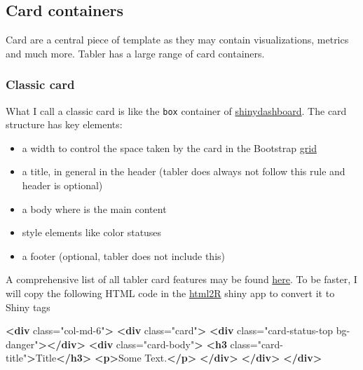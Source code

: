 \documentclass[]{book}
\newenvironment{Shaded}{\begin{snugshade}}{\end{snugshade}}
\newcommand{\KeywordTok}[1]{\textcolor[rgb]{0.13,0.29,0.53}{\textbf{#1}}}
\newcommand{\NormalTok}[1]{#1}
\newcommand{\OtherTok}[1]{\textcolor[rgb]{0.56,0.35,0.01}{#1}}
\newcommand{\StringTok}[1]{\textcolor[rgb]{0.31,0.60,0.02}{#1}}
\providecommand{\tightlist}{%
  \setlength{\itemsep}{0pt}\setlength{\parskip}{0pt}}
\begin{document}
\hypertarget{card-containers}{%
\subsection{Card containers}\label{card-containers}}

Card are a central piece of template as they may contain visualizations, metrics and much more. Tabler has a large range of card containers.

\hypertarget{classic-card}{%
\subsubsection{Classic card}\label{classic-card}}

What I call a classic card is like the \texttt{box} container of \href{https://rstudio.github.io/shinydashboard/structure.html}{shinydashboard}. The card structure has key elements:

\begin{itemize}
\tightlist
\item
  a width to control the space taken by the card in the Bootstrap \href{https://getbootstrap.com/docs/4.0/layout/grid/}{grid}
\item
  a title, in general in the header (tabler does always not follow this rule and header is optional)
\item
  a body where is the main content
\item
  style elements like color statuses
\item
  a footer (optional, tabler does not include this)
\end{itemize}

A comprehensive list of all tabler card features may be found \href{https://preview-dev.tabler.io/docs/cards.html}{here}. To be faster, I will copy the following HTML code in the \href{}{html2R} shiny app to convert it to Shiny tags

\begin{Shaded}
\begin{Highlighting}[]
\KeywordTok{<div}\OtherTok{ class=}\StringTok{"col-md-6"}\KeywordTok{>}
  \KeywordTok{<div}\OtherTok{ class=}\StringTok{"card"}\KeywordTok{>}
    \KeywordTok{<div}\OtherTok{ class=}\StringTok{"card-status-top bg-danger"}\KeywordTok{></div>}
    \KeywordTok{<div}\OtherTok{ class=}\StringTok{"card-body"}\KeywordTok{>}
      \KeywordTok{<h3}\OtherTok{ class=}\StringTok{"card-title"}\KeywordTok{>}\NormalTok{Title}\KeywordTok{</h3>}
      \KeywordTok{<p>}\NormalTok{Some Text.}\KeywordTok{</p>}
    \KeywordTok{</div>}
  \KeywordTok{</div>}
\KeywordTok{</div>}
\end{Highlighting}
\end{Shaded}
\end{document}
